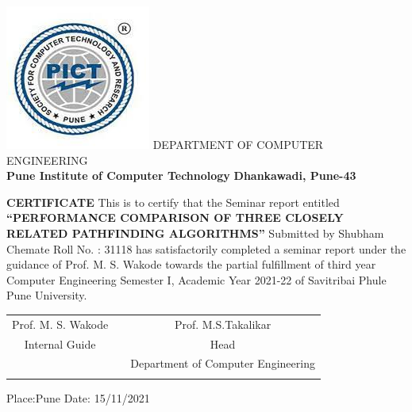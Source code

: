\documentclass[a4paper, 12pt]{article}
\begin{document}
\pagebreak
\begin{titlepage}
\begin{center}
	\includegraphics[scale=0.6]{pict} 
	\linebreak
	\Large
        DEPARTMENT OF COMPUTER ENGINEERING\\
        \textbf{Pune Institute of Computer Technology}
		\linebreak
		\textbf{Dhankawadi, Pune-43}
		\vspace{0.8cm}
		\Large
		
	    \textbf{CERTIFICATE}
	    		\linebreak
	    \linebreak
		This is to certify that the Seminar report entitled
        \linebreak
		\linebreak
		\large
		\textbf{“PERFORMANCE COMPARISON OF THREE CLOSELY RELATED PATHFINDING ALGORITHMS”}
		\linebreak
		\linebreak
		Submitted by
		\linebreak
		Shubham Chemate \hspace{10mm}   Roll No. : 31118 \linebreak
		\linebreak
		has satisfactorily completed a seminar report under the guidance of Prof. M. S. Wakode towards the partial fulfillment of third year Computer Engineering Semester I, Academic Year 2021-22 of Savitribai Phule Pune University. 
		\linebreak
		\linebreak
		\linebreak
		\linebreak
		\linebreak
		\begin{table}[h]
		\begin{tabular}{ccc}
		Prof. M. S. Wakode    &                        &  \hspace{52mm} Prof. M.S.Takalikar\\
		Internal Guide      &                     &    \hspace{52mm} Head \\
		          &                         &       \hspace{47mm} Department of Computer Engineering \\
                    &                       & \hspace{52mm} 
		\end{tabular}
		\end{table}
		\end{center}
Place:Pune \linebreak
Date: 15/11/2021


\end{titlepage}
\end{document}
